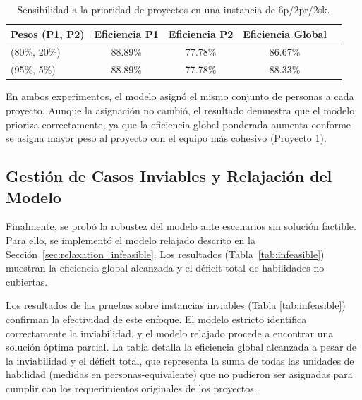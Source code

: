 \documentclass[conference]{IEEEtran}
\begin{document}
\begin{table}[htbp]
    \centering
    \caption{Sensibilidad a la prioridad de proyectos en una instancia de 6p/2pr/2sk.}
    \label{tab:sensibilidad}
    \begin{tabularx}{\linewidth}{@{}lcccc@{}}
        \toprule
        \textbf{Pesos (P1, P2)} & \textbf{Eficiencia P1} & \textbf{Eficiencia P2} & \textbf{Eficiencia Global} \\
        \midrule
        (80\%, 20\%)            & 88.89\%                & 77.78\%                & 86.67\%                    \\
        (95\%, 5\%)             & 88.89\%                & 77.78\%                & 88.33\%                    \\
        \bottomrule
    \end{tabularx}
\end{table}

En ambos experimentos, el modelo asignó el mismo conjunto de personas a cada proyecto. Aunque la asignación no cambió, el resultado demuestra que el modelo prioriza correctamente, ya que la eficiencia global ponderada aumenta conforme se asigna mayor peso al proyecto con el equipo más cohesivo (Proyecto 1).

\subsection{Gestión de Casos Inviables y Relajación del Modelo}

Finalmente, se probó la robustez del modelo ante escenarios sin solución factible. Para ello, se implementó el modelo relajado descrito en la Sección~\ref{sec:relaxation_infeasible}. Los resultados (Tabla~\ref{tab:infeasible}) muestran la eficiencia global alcanzada y el déficit total de habilidades no cubiertas.

Los resultados de las pruebas sobre instancias inviables (Tabla \ref{tab:infeasible}) confirman la efectividad de este enfoque. El modelo estricto identifica correctamente la inviabilidad, y el modelo relajado procede a encontrar una solución óptima parcial. La tabla detalla la eficiencia global alcanzada a pesar de la inviabilidad y el déficit total, que representa la suma de todas las unidades de habilidad (medidas en personas-equivalente) que no pudieron ser asignadas para cumplir con los requerimientos originales de los proyectos.
\end{document}
